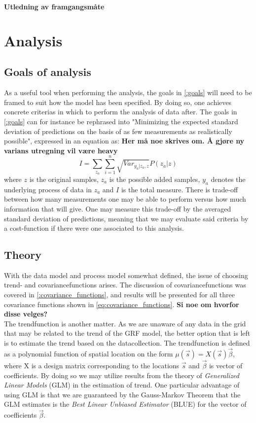 \documentclass{report}
\begin{document}
\textbf{Utledning av framgangsmåte} \\
\section{Analysis}
\subsection{Goals of analysis}
As a useful tool when performing the analysis, the goals in \ref{:goals} will need to be framed to suit how the model has been specified. By doing so, one achieves concrete criterias in which to perform the analysis of data after. The goals in \ref{:goals} can for instance be rephrased into "Minimizing the expected standard deviation of predictions on the basis of as few measurements as realistically possible", expressed in an equation as:
\textbf{Her må noe skrives om. Å gjøre ny varians utregning vil være heavy}
\begin{equation}
I = \sum_{z_a} \sum_{i=1}^n \sqrt{ Var_{y_a | z_a, z} } P(z_a | z) 
\end{equation}
where $z$ is the original samples, $z_a$ is the possible added samples, $y_a$ denotes the underlying process of data in $z_a$ and $I$ is the total measure. There is trade-off between how many measurements one may be able to perform versus how much information that will give. One may measure this trade-off by the averaged standard deviation of predictions, meaning that we may evaluate said criteria by a cost-function if there were one associated to this analysis. 

\subsection{Theory}
With the data model and process model somewhat defined, the issue of choosing trend- and covariancefunctions arises. The discussion of covariancefunctions was covered in \ref{:covariance_functions}, and results will be presented for all three covariance functions shown in \ref{eq:covariance_functions}. \textbf{Si noe om hvorfor disse velges?} \\ 
The trendfunction is another matter. As we are unaware of any data in the grid that may be related to the trend of the GRF model, the better option that is left is to estimate the trend based on the datacollection. The trendfunction is defined as a polynomial function of spatial location on the form $\mu(\vec{s}) = X(\vec{s})\vec{\beta}$, where X is a design matrix corresponding to the locations $\vec{s}$ and $\vec{\beta}$ is vector of coefficients. By doing so we may utilize results from the theory of \textit{Generalized Linear Models} (GLM) in the estimation of trend. One particular advantage of using GLM is that we are guaranteed by the Gauss-Markov Theorem that the GLM estimates is the \textit{Best Linear Unbiased Estimator} (BLUE) for the vector of coefficients $\vec{\beta}$. \\
\end{document}
